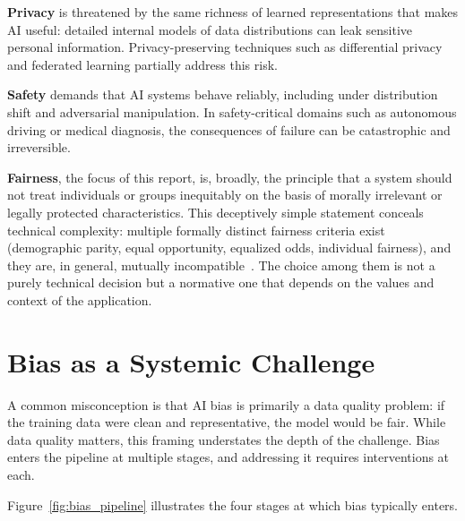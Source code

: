 \textbf{Privacy} is threatened by the same richness of learned representations
that makes AI useful: detailed internal models of data distributions can leak
sensitive personal information.  Privacy-preserving techniques such as
differential privacy and federated learning partially address this risk.

\textbf{Safety} demands that AI systems behave reliably, including under
distribution shift and adversarial manipulation.  In safety-critical
domains such as autonomous driving or medical diagnosis, the consequences
of failure can be catastrophic and irreversible.

\textbf{Fairness}, the focus of this report, is, broadly, the principle
that a system should not treat individuals or groups inequitably on the basis
of morally irrelevant or legally protected characteristics.  This deceptively
simple statement conceals technical complexity: multiple formally distinct
fairness criteria exist (demographic parity, equal opportunity, equalized
odds, individual fairness), and they are, in general, mutually
incompatible~\cite{chouldechova2017fair}.  The choice among them is not a
purely technical decision but a normative one that depends on the values and
context of the application.

\section{Bias as a Systemic Challenge}
\label{sec:bias_systemic}

A common misconception is that AI bias is primarily a data quality problem:
if the training data were clean and representative, the model would be fair.
While data quality matters, this framing understates the depth of the
challenge.  Bias enters the pipeline at multiple stages, and addressing it
requires interventions at each.

Figure~\ref{fig:bias_pipeline} illustrates the four stages at which bias
typically enters.

